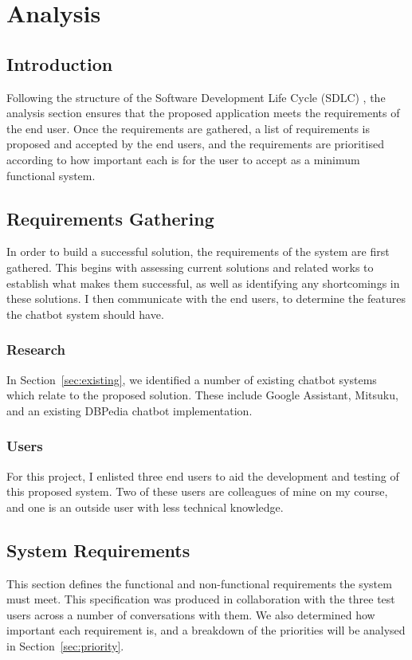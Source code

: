 \chapter{Analysis}
\label{ch:analysis}
\section{Introduction}
Following the structure of the Software Development Life Cycle (SDLC) , the analysis section ensures that the proposed application meets the requirements of the end user. Once the requirements are gathered, a list of requirements is proposed and accepted by the end users, and the requirements are prioritised according to how important each is for the user to accept as a minimum functional system. 

\section{Requirements Gathering}
In order to build a successful solution, the requirements of the system are first gathered. This begins with assessing current solutions and related works to establish what makes them successful, as well as identifying any shortcomings in these solutions. I then communicate with the end users, to determine the features the chatbot system should have.

\subsection{Research}
In Section~\ref{sec:existing}, we identified a number of existing chatbot systems which relate to the proposed solution. These include Google Assistant, Mitsuku, and an existing DBPedia chatbot implementation.

\subsection{Users}
For this project, I enlisted three end users to aid the development and testing of this proposed system. Two of these users are colleagues of mine on my course, and one is an outside user with less technical knowledge.

\newpage
\section{System Requirements}
This section defines the functional and non-functional requirements the system must meet. This specification was produced in collaboration with the three test users across a number of conversations with them. We also determined how important each requirement is, and a breakdown of the priorities will be analysed in Section~\ref{sec:priority}.

